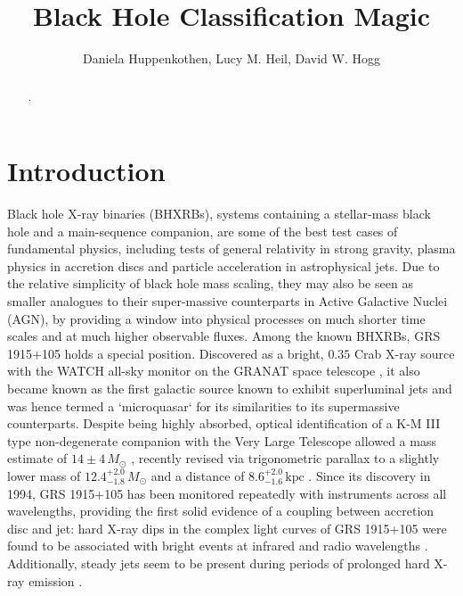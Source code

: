 \documentclass[12pt]{emulateapj}
\begin{document}
\title{Black Hole Classification Magic}

\author{Daniela Huppenkothen, Lucy M. Heil, David W. Hogg}
 
  

\begin{abstract}
.

\end{abstract}


\section{Introduction}

Black hole X-ray binaries (BHXRBs), systems containing a stellar-mass black hole and a main-sequence companion, are some of the best test cases of fundamental physics, including tests of general relativity in strong gravity, plasma physics in accretion discs and particle acceleration in astrophysical jets. 
Due to the relative simplicity of black hole mass scaling, they may also be seen as smaller analogues to their super-massive counterparts in Active Galactive Nuclei (AGN), by providing a window into physical processes on much shorter time scales and at much higher observable fluxes.
Among the known BHXRBs, GRS 1915+105 holds a special position. Discovered as a bright, $0.35$ Crab X-ray source \citep{castrotirado1994} with the WATCH all-sky monitor on the GRANAT space telescope \citep{castrotirado1992}, it also became known as the first galactic source known to exhibit superluminal jets \citep{mirabel1994, fender1999} and was hence termed a `microquasar` for its similarities to its supermassive counterparts. 
Despite being highly absorbed, optical identification of a K-M III type non-degenerate companion with the Very Large Telescope allowed a mass estimate of $14\pm 4\,M_\odot$ \citep{greiner2001}, recently revised via trigonometric parallax to a slightly lower mass of $12.4^{+2.0}_{-1.8}\, M_\odot$ and a distance of $8.6^{+2.0}_{-1.6}\,\mathrm{kpc}$ \citep{reid2014}. 
Since its discovery in 1994, GRS 1915+105 has been monitored repeatedly with instruments across all wavelengths, providing the first solid evidence of a coupling between accretion disc and jet: hard X-ray dips in the complex light curves of GRS 1915+105 were found to be associated with bright events at infrared and radio wavelengths \citep{pooley1997, eikenberry1998a, eikenberry1998b, kleinwolt2002}. Additionally, steady jets seem to be present during periods of prolonged hard X-ray emission \citep{foster1996, dhawan2000, fucs2003}. 
\end{document}
